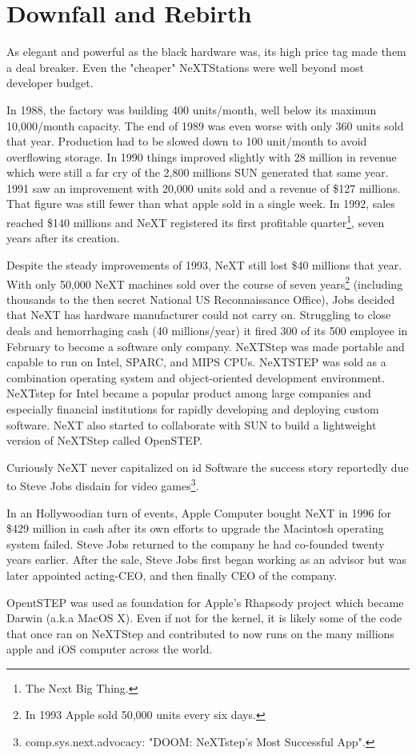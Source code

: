 \section{Downfall and Rebirth}
As elegant and powerful as the black hardware was, its high price tag made them a deal breaker. Even the "cheaper" NeXTStations were well beyond most developer budget.\\
\par
 In 1988, the factory was building 400 units/month, well below its maximun 10,000/month capacity. The end of 1989 was even worse with only 360 units sold that year. Production had to be slowed down to 100 unit/month to avoid overflowing storage. In 1990 things improved slightly with 28 million in revenue which were still a far cry of the 2,800 millions SUN generated that same year. 1991 saw an improvement with 20,000 units sold and a revenue of \$127 millions. That figure was still fewer than what apple sold in a single week. In 1992, sales reached \$140 millions and NeXT registered its first profitable quarter\footnote{The Next Big Thing.}, seven years after its creation.\\
\par
Despite the steady improvements of 1993, NeXT still lost \$40 millions that year. With only 50,000 NeXT machines sold over the course of seven years\footnote{In 1993 Apple sold 50,000 units every six days.} (including thousands to the then secret National US Reconnaissance Office), Jobs decided that NeXT has hardware manufacturer could not carry on. Struggling to close deals and hemorrhaging cash (40 millions/year) it fired 300 of its 500 employee in February to become a software only company. NeXTStep was made portable and capable to run on Intel, SPARC, and MIPS CPUs. NeXTSTEP was sold as a combination operating system and object-oriented development environment. NeXTstep for Intel became a popular product among large companies and especially financial institutions for rapidly developing and deploying custom software. NeXT also started to collaborate with SUN to build a lightweight version of NeXTStep called OpenSTEP.\\
\par
Curiously NeXT never capitalized on id Software the success story reportedly due to Steve Jobs disdain for video games\footnote{comp.sys.next.advocacy: "DOOM: NeXTstep's Most Successful App".}.\\
\par
In an Hollywoodian turn of events, Apple Computer bought NeXT in 1996 for \$429 million in cash after its own efforts to upgrade the Macintosh operating system failed.  Steve Jobs returned to the company he had co-founded twenty years earlier. After the sale, Steve Jobs first began working as an advisor but was later appointed acting-CEO, and then finally CEO of the company.\\
\par
OpentSTEP was used as foundation for Apple's Rhapsody project which became Darwin (a.k.a MacOS X). Even if not for the kernel, it is likely some of the code that once ran on NeXTStep and contributed to \doom now runs on the many millions apple and iOS computer across the world.\\



